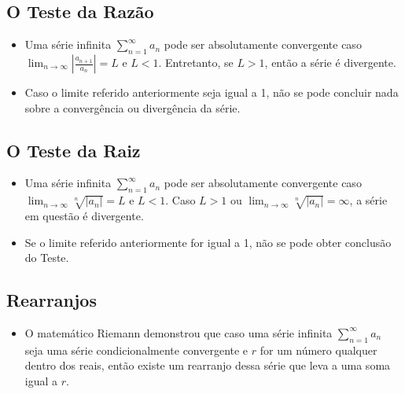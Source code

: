 		\subsection{O Teste da Razão}
		
			\begin{itemize}
				
				\item Uma série infinita $\sum_{n = 1}^{\infty} a_{n}$ pode ser absolutamente convergente caso $\lim_{n\rightarrow  \infty} |\frac{a_{n+1}}{a_{n}}| = L$ e $L < 1$. Entretanto, se $L > 1$, então a série é divergente.
				
				\item Caso o limite referido anteriormente seja igual a 1, não se pode concluir nada sobre a convergência ou divergência da série.	
				
			\end{itemize}
		
		\subsection{O Teste da Raiz}
			
			\begin{itemize}
				
				\item Uma série infinita $\sum_{n = 1}^{\infty} a_{n}$ pode ser absolutamente convergente caso $\lim_{n\rightarrow  \infty} \sqrt[n]{|a_{n}|} = L$ e $L < 1$. Caso $L > 1$ ou $\lim_{n\rightarrow  \infty} \sqrt[n]{|a_{n}|} = \infty$, a série em questão é divergente.
				
				\item Se o limite referido anteriormente for igual a 1, não se pode obter conclusão do Teste.
				
			\end{itemize}
		
		\subsection{Rearranjos}
		
			\begin{itemize}
				
				\item O matemático Riemann demonstrou que caso uma série infinita $\sum_{n = 1}^{\infty} a_{n}$ seja uma série condicionalmente convergente e $r$ for um número qualquer dentro dos reais, então existe um rearranjo dessa série que leva a uma soma igual a $r$.
				
			\end{itemize}
		
